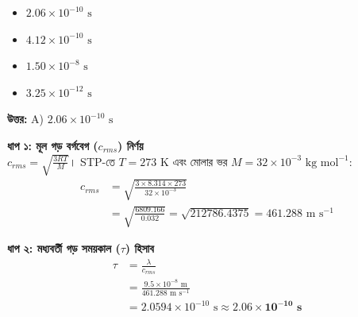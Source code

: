 \documentclass[12pt, a4paper]{article}
\begin{document}
\begin{itemize}[label={}, leftmargin=1cm, itemsep=0.5em]
    \item[\textbf{A)}] $2.06 \times 10^{-10}\text{ s}$
    \item[\textbf{B)}] $4.12 \times 10^{-10}\text{ s}$
    \item[\textbf{C)}] $1.50 \times 10^{-8}\text{ s}$
    \item[\textbf{D)}] $3.25 \times 10^{-12}\text{ s}$
\end{itemize}

\vspace{0.5em}
\begin{tcolorbox}[answerbox]
    \textbf{\color{success} উত্তর:} A) $2.06 \times 10^{-10}\text{ s}$
\end{tcolorbox}
\vspace{1em}

\begin{tcolorbox}[solutionbox={সমাধান (Solution)}]
    \noindent
    \textbf{ধাপ ১: মূল গড় বর্গবেগ ($c_{rms}$) নির্ণয়} \\
    $c_{rms} = \sqrt{\frac{3 R T}{M}}$। STP-তে $T = 273\text{ K}$ এবং মোলার ভর $M = 32 \times 10^{-3}\text{ kg mol}^{-1}$:
    \begin{align*}
        c_{rms} &= \sqrt{\frac{3 \times 8.314 \times 273}{32 \times 10^{-3}}} \\
        &= \sqrt{\frac{6809.166}{0.032}} = \sqrt{212786.4375} = 461.288\text{ m s}^{-1}
    \end{align*}
    
    \vspace{0.4em}
    \noindent\textbf{ধাপ ২: মধ্যবর্তী গড় সময়কাল ($\tau$) হিসাব}
    \begin{align*}
        \tau &= \frac{\lambda}{c_{rms}} \\
        &= \frac{9.5 \times 10^{-8}\text{ m}}{461.288\text{ m s}^{-1}} \\
        &= 2.0594 \times 10^{-10}\text{ s} \approx \mathbf{2.06 \times 10^{-10}\text{ s}}
    \end{align*}
\end{tcolorbox}

\vspace{2em}
\end{document}
